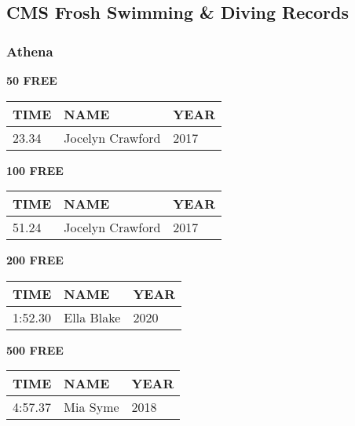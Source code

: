 \subsection{CMS Frosh Swimming \& Diving Records}
\subsubsection{Athena}

\begin{table}[H]
\centering
\begin{minipage}[t]{0.48\textwidth}
\centering
\textbf{50 FREE}\\[0.1cm]
\begin{tabular}{@{}p{1.8cm}p{2.8cm}p{1.2cm}@{}}
\hline
    \textbf{TIME} & \textbf{NAME} & \textbf{YEAR} \\
\hline
    23.34 & Jocelyn Crawford & 2017 \\
\hline
\end{tabular}
\end{minipage}\hfill
\begin{minipage}[t]{0.48\textwidth}
\centering
\textbf{100 FREE}\\[0.1cm]
\begin{tabular}{@{}p{1.8cm}p{2.8cm}p{1.2cm}@{}}
\hline
    \textbf{TIME} & \textbf{NAME} & \textbf{YEAR} \\
\hline
    51.24 & Jocelyn Crawford & 2017 \\
\hline
\end{tabular}
\end{minipage}
\end{table}

\begin{table}[H]
\centering
\begin{minipage}[t]{0.48\textwidth}
\centering
\textbf{200 FREE}\\[0.1cm]
\begin{tabular}{@{}p{1.8cm}p{2.8cm}p{1.2cm}@{}}
\hline
    \textbf{TIME} & \textbf{NAME} & \textbf{YEAR} \\
\hline
    1:52.30 & Ella Blake & 2020 \\
\hline
\end{tabular}
\end{minipage}\hfill
\begin{minipage}[t]{0.48\textwidth}
\centering
\textbf{500 FREE}\\[0.1cm]
\begin{tabular}{@{}p{1.8cm}p{2.8cm}p{1.2cm}@{}}
\hline
    \textbf{TIME} & \textbf{NAME} & \textbf{YEAR} \\
\hline
    4:57.37 & Mia Syme & 2018 \\
\hline
\end{tabular}
\end{minipage}
\end{table}

